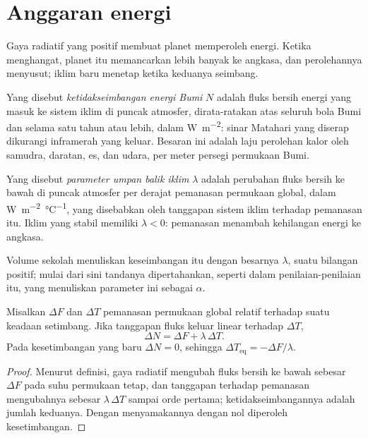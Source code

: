 \section{Anggaran energi}\label{sec:b2:anthropogenic-climate-change:energy}

Gaya radiatif yang positif membuat planet memperoleh energi. Ketika menghangat, planet itu memancarkan lebih banyak ke angkasa, dan
perolehannya menyusut; iklim baru menetap ketika keduanya seimbang.

\begin{definition}\label{def:b2:anthropogenic-climate-change:eei}
Yang disebut \emph{ketidakseimbangan energi Bumi} $N$ adalah fluks bersih energi yang masuk ke
sistem iklim di puncak atmosfer, dirata-ratakan atas seluruh bola Bumi dan selama satu tahun atau lebih,
dalam \unit{W.m^{-2}}: sinar Matahari yang diserap dikurangi inframerah yang keluar. Besaran ini adalah laju perolehan kalor oleh samudra,
daratan, es, dan udara, per meter persegi permukaan Bumi.
\end{definition}

\begin{definition}\label{def:b2:anthropogenic-climate-change:lambda}
Yang disebut \emph{parameter umpan balik iklim} $\lambda$ adalah perubahan
fluks bersih ke bawah di puncak atmosfer per derajat pemanasan permukaan global, dalam
\unit{W.m^{-2}.\celsius^{-1}}, yang disebabkan oleh tanggapan sistem iklim terhadap pemanasan itu. Iklim
yang stabil memiliki $\lambda < 0$: pemanasan menambah kehilangan energi ke angkasa.
\end{definition}

Volume sekolah menuliskan keseimbangan itu dengan besarnya $\lambda$, suatu bilangan positif; mulai dari sini
tandanya dipertahankan, seperti dalam penilaian-penilaian itu, yang menuliskan parameter ini sebagai $\alpha$.

\begin{proposition}\label{prop:b2:anthropogenic-climate-change:balance}
Misalkan $\Delta F$  dan $\Delta T$ pemanasan permukaan global
relatif terhadap suatu keadaan setimbang. Jika tanggapan fluks keluar linear terhadap $\Delta T$,
\[
  \Delta N = \Delta F + \lambda\,\Delta T .
\]
Pada kesetimbangan yang baru $\Delta N = 0$, sehingga $\Delta T_{\text{eq}} = -\Delta F/\lambda$.
\end{proposition}
\begin{proof}
Menurut definisi, gaya radiatif mengubah fluks bersih ke bawah sebesar $\Delta F$ pada suhu permukaan
tetap, dan tanggapan terhadap pemanasan mengubahnya sebesar $\lambda\,\Delta T$ sampai orde pertama;
ketidakseimbangannya adalah jumlah keduanya. Dengan menyamakannya dengan nol diperoleh kesetimbangan.
\end{proof}


